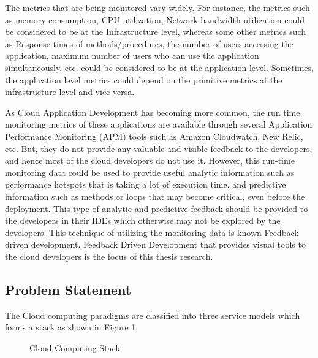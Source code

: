 \documentclass[article,type=msc,colorback,12pt,accentcolor=tud7b]{tudthesis}
\begin{document}
	\par The metrics that are being monitored vary widely. For instance, the metrics such as memory consumption, CPU utilization, Network bandwidth utilization could be considered to be at the Infrastructure level, whereas some other metrics such as Response times of methods/procedures, the number of users accessing the application, maximum number of users who can use the application simultaneously, etc. could be considered to be at the application level. Sometimes, the application level metrics could depend on the primitive metrics at the infrastructure level and vice-versa.
	
	\par As Cloud Application Development has becoming more common, the run time monitoring metrics of these applications are available through several Application Performance Monitoring (APM) tools such as Amazon Cloudwatch, New Relic, etc. But, they do not provide any valuable and visible feedback to the developers, and hence most of the cloud developers do not use it. However, this run-time monitoring data could be used to provide useful analytic information such as performance hotspots that is taking a lot of execution time, and predictive information such as methods or loops that may become critical, even before the deployment. This type of analytic and predictive feedback should be provided to the developers in their IDEs which otherwise may not be explored by the developers. This technique of utilizing the monitoring data is known Feedback driven development. Feedback Driven Development that provides visual tools to the cloud developers is the focus of this thesis research.	
	
	\subsection{Problem Statement}	
	
The Cloud computing paradigms are classified into three service models which forms a stack as shown in Figure 1. 

 \begin{figure}
 \begin{center}
  \makebox[\textwidth]{\texttt{[image: A1]}}
\end{center}
\caption{Cloud Computing Stack}
\end{figure}

%	
%	
%	
	
\end{document}

